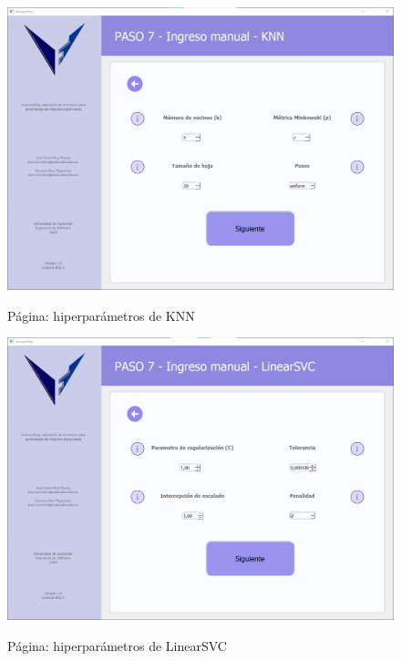 \begin{figure}[H]
    \centering
    \caption{Página: hiperparámetros de KNN}
    \includegraphics[width=\textwidth]{images/knn.png}
    \label{fig:knn}
\end{figure}

\begin{figure}[H]
    \centering
    \caption{Página: hiperparámetros de LinearSVC}
    \includegraphics[width=\textwidth]{images/linearsvc.png}
    \label{fig:linearsvc}
\end{figure}

